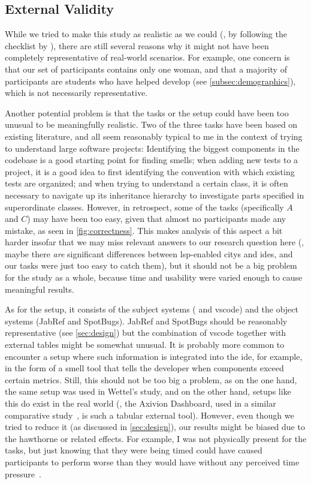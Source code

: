 \documentclass[../thesis]{subfiles}
\begin{document}
\subsection{External Validity}
While we tried to make this study as realistic as we could (\eg, by following the checklist by \textcite{wettel2011}), there are still several reasons why it might not have been completely representative of real-world scenarios.
For example, one concern is that our set of participants contains only one woman, and that a majority of participants are students who have helped develop \SEE{} (see \cref{subsec:demographics}), which is not necessarily representative.

Another potential problem is that the tasks or the setup could have been too unusual to be meaningfully realistic.
Two of the three tasks have been based on existing literature, and all seem reasonably typical to me in the context of trying to understand large software projects:
Identifying the biggest components in the codebase is a good starting point for finding \glspl{smell};
when adding new tests to a project, it is a good idea to first identifying the convention with which existing tests are organized;
and when trying to understand a certain class, it is often necessary to navigate up its inheritance hierarchy to investigate parts specified in superordinate classes.
However, in retrospect, some of the tasks (specifically $A$ and $C$) may have been too easy, given that almost no participants made any mistake, as seen in \cref{fig:correctness}.
This makes analysis of this aspect a bit harder insofar that we may miss relevant answers to our research question here (\eg, maybe there \emph{are} significant differences between \gls{lsp}-enabled \glspl{city} and \glspl{ide}, and our tasks were just too easy to catch them), but it should not be a big problem for the study as a whole, because time and usability were varied enough to cause meaningful results.

As for the setup, it consists of the subject systems (\SEE{} and \gls{vscode}) and the object systems (JabRef and SpotBugs).
JabRef and SpotBugs should be reasonably representative (see \cref{sec:design}) but the combination of \gls{vscode} together with external tables might be somewhat unusual.
It is probably more common to encounter a setup where such information is integrated into the \gls{ide}, for example, in the form of a \gls{smell} tool that tells the developer when components exceed certain metrics.
Still, this should not be too big a problem, as on the one hand, the same setup was used in Wettel's study, and on the other hand, setups like this do exist in the real world (\eg, the Axivion Dashboard, used in a similar comparative study~\cite[section~4.1]{galperin2021}, is such a tabular external tool).
However, even though we tried to reduce it (as discussed in \cref{sec:design}), our results might be biased due to the \gls{hawthorne} or related effects.
For example, I was not physically present for the tasks, but just knowing that they were being timed could have caused participants to perform worse than they would have without any perceived time pressure~\cite[\eg,][]{sussman2022a}.
\end{document}
